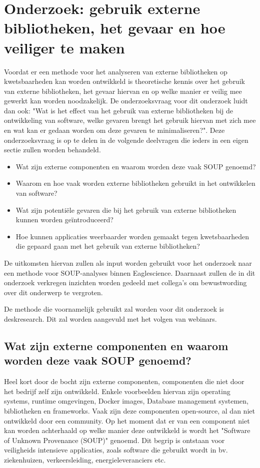 \chapter{Onderzoek: gebruik externe bibliotheken, het gevaar en hoe veiliger te maken}\label{ch:externeBibliothekengebruikGevaren}
Voordat er een methode voor het analyseren van externe bibliotheken op kwetsbaarheden kan worden ontwikkeld is theoretische kennis over het gebruik van externe bibliotheken, het gevaar hiervan en op welke manier er veilig mee gewerkt kan worden noodzakelijk. De onderzoeksvraag voor dit onderzoek luidt dan ook: "Wat is het effect van het gebruik van externe bibliotheken bij de ontwikkeling van software, welke gevaren brengt het gebruik hiervan met zich mee en wat kan er gedaan worden om deze gevaren te minimaliseren?". Deze onderzoeksvraag is op te delen in de volgende deelvragen die ieders in een eigen sectie zullen worden behandeld.

\begin{itemize}
    \item Wat zijn externe componenten en waarom worden deze vaak SOUP genoemd?
    \item Waarom en hoe vaak worden externe bibliotheken gebruikt in het ontwikkelen van software?
    \item Wat zijn potentiële gevaren die bij het gebruik van externe bibliotheken kunnen worden geïntroduceerd?
    \item Hoe kunnen applicaties weerbaarder worden gemaakt tegen kwetsbaarheden die gepaard gaan met het gebruik van externe bibliotheken?
\end{itemize}
De uitkomsten hiervan zullen als input worden gebruikt voor het onderzoek naar een methode voor SOUP-analyses binnen Eaglescience. Daarnaast zullen de in dit onderzoek verkregen inzichten worden gedeeld met collega's om bewustwording over dit onderwerp te vergroten.

De methode die voornamelijk gebruikt zal worden voor dit onderzoek is deskresearch. Dit zal worden aangevuld met het volgen van webinars.

\section{Wat zijn externe componenten en waarom worden deze vaak SOUP genoemd?}\label{sec:watisSOUP}
Heel kort door de bocht zijn externe componenten, componenten die niet door het bedrijf zelf zijn ontwikkeld. Enkele voorbeelden hiervan zijn operating systems, runtime omgevingen, Docker images, Database management systemen, bibliotheken en frameworks. Vaak zijn deze componenten open-source, al dan niet ontwikkeld door een community. Op het moment dat er van een component niet kan worden achterhaald op welke manier deze ontwikkeld is wordt het "Software of Unknown Provenance (SOUP)" genoemd. Dit begrip is ontstaan voor veiligheids intensieve applicaties, zoals software die gebruikt wordt in bv. ziekenhuizen, verkeersleiding, energieleveranciers etc.


